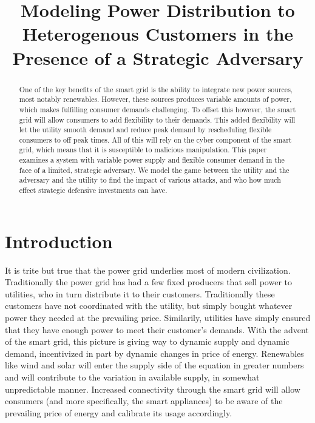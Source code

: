 \documentclass[conference]{IEEEtran}
\begin{document}
\title{Modeling Power Distribution to Heterogenous Customers in the Presence of a Strategic Adversary}

\author{
}

\maketitle

\begin{abstract}
One of the key benefits of the smart grid is the ability to integrate new power sources, most notably renewables.  However, these sources produces variable amounts of power, which makes fulfilling consumer demands challenging.  To offset this however, the smart grid will allow consumers to add flexibility to their demands.  This added flexibility will let the utility smooth demand and reduce peak demand by rescheduling flexible consumers to off peak times.  All of this will rely on the cyber component of the smart grid, which means that it is susceptible to malicious manipulation.  This paper examines a system with variable power supply and flexible consumer demand in the face of a limited, strategic adversary.  We model the game between the utility and the adversary and the utility to find the impact of various attacks, and who how much effect strategic defensive investments can have.

\end{abstract}


\section{Introduction}
\label{Introduction}

It is trite but true that the power grid underlies most of modern civilization.  Traditionally the power grid has had a 
few fixed producers that sell power to utilities, who in turn distribute it to their customers.  Traditionally these 
customers have not coordinated with the utility, but simply bought whatever power they needed at the prevailing price.  
Similarily, utilities have simply ensured that they have enough power to meet their customer's demands.  
With the advent of the smart grid, this picture is giving way to dynamic supply and dynamic demand, incentivized in part by dynamic changes in price of energy.  Renewables like wind and solar will enter the supply side of the equation in greater numbers and will contribute to the variation in available supply, in somewhat unpredictable manner. Increased connectivity through the smart grid will allow consumers (and more specifically, the smart appliances) to be 
aware of the prevailing price of energy and calibrate its usage accordingly. 
\end{document}
